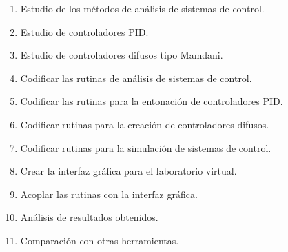 \vspace{10pt}

\begin{enumerate}[label=\bfseries Actividad \arabic*:, wide=0pt, leftmargin=*]
	\item Estudio de los métodos de análisis de sistemas de control. 
	\item Estudio de controladores PID.
	\item Estudio de controladores difusos tipo Mamdani.
	\item Codificar las rutinas de análisis de sistemas de control.
	\item Codificar las rutinas para la entonación de controladores PID.
	\item Codificar rutinas para la creación de controladores difusos.
	\item Codificar rutinas para la simulación de sistemas de control.
	\item Crear la interfaz gráfica para el laboratorio virtual.
	\item Acoplar las rutinas con la interfaz gráfica.
	\item Análisis de resultados obtenidos.
	\item Comparación con otras herramientas.
\end{enumerate}

